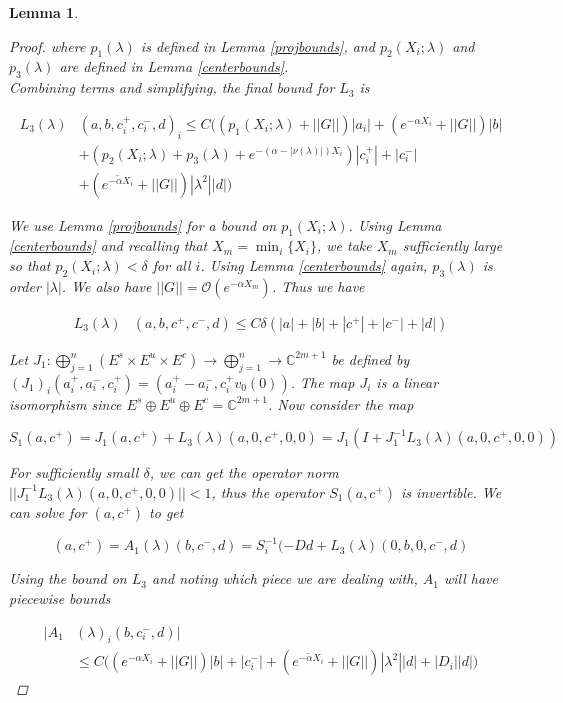 \documentclass[12pt]{article}
\def\C{{\mathbb C}}
\newtheorem{lemma}{Lemma}
\begin{document}
\begin{lemma}
\begin{proof}
where $p_1(\lambda)$ is defined in Lemma \ref{projbounds}, and $p_2(X_i; \lambda)$ and $p_3(\lambda)$ are defined in Lemma \ref{centerbounds}.\\

Combining terms and simplifying, the final bound for $L_3$ is

\begin{align*}
L_3(\lambda)&(a, b, c_i^+, c_i^-, d)_i \leq C ( (p_1(X_i; \lambda) + ||G||)|a_i|
+ (e^{-\alpha X_i} + ||G||) |b| \\
&+ (p_2(X_i; \lambda) + p_3(\lambda) + e^{-(\alpha - |\nu(\lambda)|)X_i})|c_i^+| + |c_i^-| \\
&+ ( e^{-\tilde{\alpha} X_i} + ||G||) |\lambda^2| |d| )
\end{align*}

We use Lemma \ref{projbounds} for a bound on $p_1(X_i; \lambda)$. Using Lemma \ref{centerbounds} and recalling that $X_m = \min_i \{ X_i \}$, we take $X_m$ sufficiently large so that $p_2(X_i; \lambda) < \delta$ for all $i$. Using Lemma \ref{centerbounds} again, $p_3(\lambda)$ is order $|\lambda|$. We also have $||G|| = \mathcal{O}(e^{-\alpha X_m})$. Thus we have

\begin{align*}
L_3(\lambda)&(a, b, c^+, c^-, d)\leq C \delta (|a| + |b| + |c^+| + |c^-| + |d|)
\end{align*}

Let $J_1: \bigoplus_{j=1}^n (E^s \times E^u \times E^c) \rightarrow \bigoplus_{j=1}^n \rightarrow \C^{2m+1}$ be defined by $(J_1)_i(a_i^+, a_i^-, c_i^+) = (a_i^+ - a_i^-, c_i^+ v_0(0) )$. The map $J_i$ is a linear isomorphism since $E^s \oplus E^u \oplus E^c = \C^{2m + 1}$. Now consider the map

\[
S_1(a, c^+) = J_1 (a, c^+) + L_3(\lambda)(a, 0, c^+, 0, 0) = J_1( I + J_1^{-1} L_3(\lambda)(a, 0, c^+, 0, 0))
\]

For sufficiently small $\delta$, we can get the operator norm $||J_1^{-1} L_3(\lambda)(a, 0, c^+, 0, 0)|| < 1$, thus the operator $S_1(a, c^+)$ is invertible. We can solve for $(a, c^+)$ to get

\[
(a, c^+) = A_1(\lambda)(b, c^-, d) = S_i^{-1}(-D d + L_3(\lambda)(0, b, 0, c^-, d)
\]

Using the bound on $L_3$ and noting which piece we are dealing with, $A_1$ will have piecewise bounds

\begin{align*}
|A_1&(\lambda)_i(b, c_i^-, d)| \\
&\leq C \Big( (e^{-\alpha X_i} + ||G||) |b| + |c_i^-|
+ (e^{-\tilde{\alpha} X_i} + ||G||) |\lambda^2| |d| + |D_i||d| \Big)
\end{align*} 


\end{proof}
\end{lemma}
\end{document}
